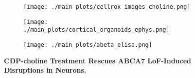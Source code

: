 \begin{figure}[H]
    \begin{subfigure}[t]{.4\textwidth}
        \caption{}
        \texttt{[image: ./main\_plots/cellrox\_images\_choline.png]}        
    \end{subfigure}
    \begin{subfigure}[t]{.2\textwidth}
        \caption{}
        \texttt{[image: ./main\_plots/cortical\_organoids\_ephys.png]}        
    \end{subfigure} 
    \begin{subfigure}[t]{.4\textwidth}
        \caption{}
        \texttt{[image: ./main\_plots/abeta\_elisa.png]}        
    \end{subfigure}  
    \caption{
        \textbf{CDP-choline Treatment Rescues ABCA7 LoF-Induced Disruptions in Neurons.}\\
    }
    \label{fig:main_choline}
\end{figure}

